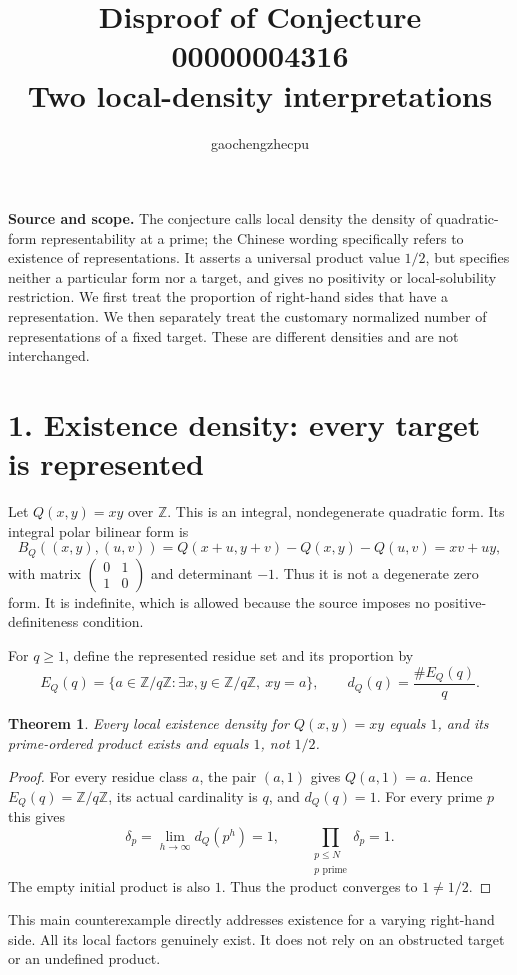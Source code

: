 \documentclass[11pt]{article}
\title{Disproof of Conjecture 00000004316\\Two local-density interpretations}
\author{gaochengzhecpu}\date{}
\newtheorem{theorem}{Theorem}
\begin{document}
\maketitle
\noindent\textbf{Source and scope.} The conjecture calls local density the density of quadratic-form representability at a prime; the Chinese wording specifically refers to existence of representations. It asserts a universal product value $1/2$, but specifies neither a particular form nor a target, and gives no positivity or local-solubility restriction. We first treat the proportion of right-hand sides that have a representation. We then separately treat the customary normalized number of representations of a fixed target. These are different densities and are not interchanged.

\section*{1. Existence density: every target is represented}
Let $Q(x,y)=xy$ over $\mathbb Z$. This is an integral, nondegenerate quadratic form. Its integral polar bilinear form is
\[
 B_Q((x,y),(u,v))=Q(x+u,y+v)-Q(x,y)-Q(u,v)=xv+uy,
\]
with matrix $\left(\begin{smallmatrix}0&1\\1&0\end{smallmatrix}\right)$ and determinant $-1$. Thus it is not a degenerate zero form. It is indefinite, which is allowed because the source imposes no positive-definiteness condition.

For $q\geq1$, define the represented residue set and its proportion by
\[
 E_Q(q)=\{a\in\mathbb Z/q\mathbb Z:\exists x,y\in\mathbb Z/q\mathbb Z,
       \ xy=a\},\qquad d_Q(q)=\frac{\#E_Q(q)}q.
\]
\begin{theorem}
Every local existence density for $Q(x,y)=xy$ equals $1$, and its prime-ordered product exists and equals $1$, not $1/2$.
\end{theorem}
\begin{proof}
For every residue class $a$, the pair $(a,1)$ gives $Q(a,1)=a$. Hence $E_Q(q)=\mathbb Z/q\mathbb Z$, its actual cardinality is $q$, and $d_Q(q)=1$. For every prime $p$ this gives
\[
 \delta_p=\lim_{h\to\infty}d_Q(p^h)=1,
 \qquad
 \prod_{\substack{p\leq N\\p\text{ prime}}}\delta_p=1.
\]
The empty initial product is also $1$. Thus the product converges to $1\ne1/2$.
\end{proof}
This main counterexample directly addresses existence for a varying right-hand side. All its local factors genuinely exist. It does not rely on an obstructed target or an undefined product.
\end{document}
